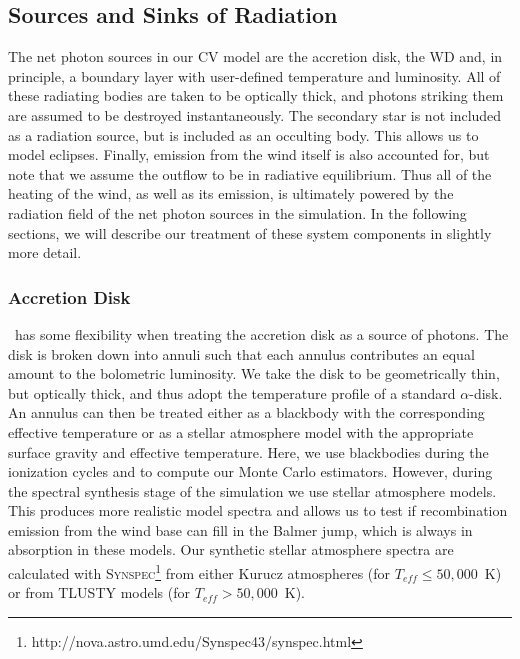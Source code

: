 \documentclass[preprint, a4paper, 11pt]{aastex}
\begin{document}
\subsection{Sources and Sinks of Radiation}
\label{radsources}

The net photon sources in our CV model are the accretion disk, the
WD and, in principle, a boundary layer with user-defined temperature
and luminosity. All of these radiating bodies are taken to be
optically thick, and photons striking them are assumed to be destroyed
instantaneously. The secondary star is not included as a radiation
source, but is included as an occulting body. This allows us to model
eclipses. Finally, emission from the wind itself is also accounted for, but
note that we assume the outflow to be in radiative equilibrium. Thus all
of the heating of the wind, as well as its emission, is ultimately
powered by the radiation field of the net photon sources in the
simulation. In the following sections, we will describe our treatment
of these system components in slightly more detail.

\subsubsection{Accretion Disk}

\py\ has some flexibility when treating the accretion 
disk as a source of photons. The disk is broken down into annuli 
such that each annulus contributes an equal amount to the bolometric
luminosity. We take the disk to be geometrically thin, but optically
thick, and thus adopt the temperature profile of a standard
\cite{shakurasunyaev1973} $\alpha$-disk. An annulus can then
be treated either as a blackbody with the corresponding effective
temperature or as a stellar atmosphere model with the appropriate
surface gravity and effective temperature. Here, we use blackbodies 
during the ionization cycles and to compute our Monte Carlo
estimators. However, during the spectral synthesis stage of the 
simulation we use stellar atmosphere models. This produces more
realistic model spectra and allows us to test if recombination
emission from the wind base can fill in the Balmer jump, which is
always in absorption in these models. Our synthetic stellar atmosphere
spectra are calculated with
\textsc{Synspec}\footnote{http://nova.astro.umd.edu/Synspec43/synspec.html}
from either Kurucz \citep{kurucz1991} atmospheres (for $T_{eff} \leq
50,000$~K) or from \textsc{TLUSTY} models \citep{tlusty} (for $T_{eff} > 50,000$~K). 
\end{document}
